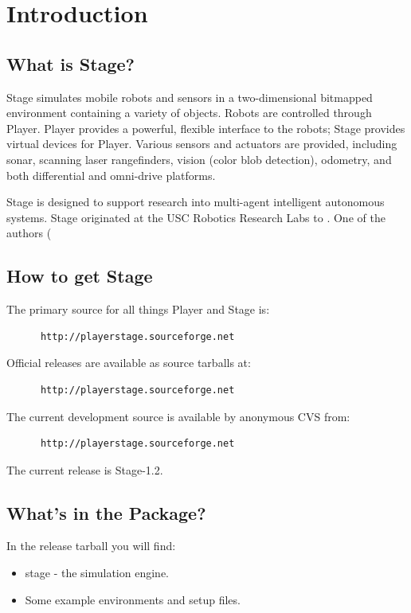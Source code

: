 \documentclass[11pt]{report}
\def\VERSION {1.2}
\begin{document}
\setcounter{page}{0}


\chapter{Introduction}

  \section{What is Stage?}

    Stage simulates mobile robots and sensors in a two-dimensional
    bitmapped environment containing a variety of objects. Robots are
    controlled through Player. Player provides a powerful, flexible
    interface to the robots; Stage provides virtual devices for
    Player.  Various sensors and actuators are provided, including
    sonar, scanning laser rangefinders, vision (color blob detection),
    odometry, and both differential and omni-drive platforms.

	Stage is designed to support research into multi-agent
    intelligent autonomous systems.  Stage originated at the USC
    Robotics Research Labs to . One of the authors (

  \section{How to get Stage}

    The primary source for all things Player and Stage is:
      \begin{verbatim}
      http://playerstage.sourceforge.net
      \end{verbatim}	
   Official releases are available as source tarballs at:
      \begin{verbatim}
      http://playerstage.sourceforge.net
      \end{verbatim}
   The current development source is available by anonymous CVS from:
      \begin{verbatim}
      http://playerstage.sourceforge.net
      \end{verbatim}
The current release is Stage-\VERSION.

  \section{What's in the Package?}

    In the release tarball you will find:
      \begin{itemize}    
      \item stage    - the simulation engine.
      \item Some example environments and setup files.
      \end{itemize}
\end{document}
